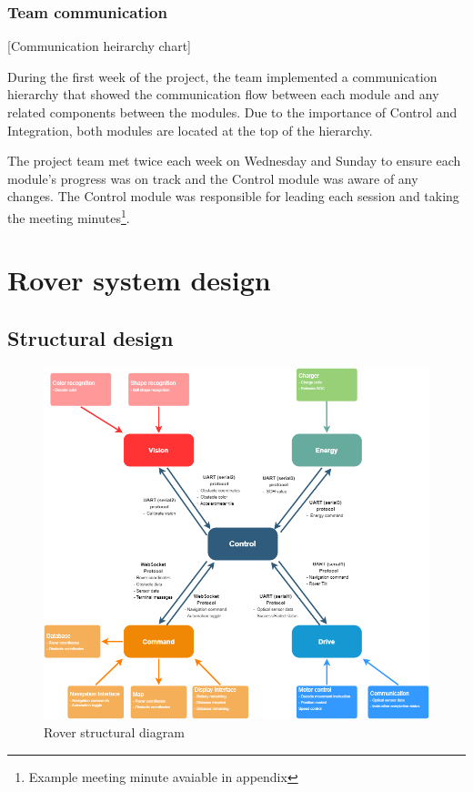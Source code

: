 \documentclass[11pt, a4paper]{article}
\begin{document}
\subsubsection{Team communication}

\begin{center}
    [Communication heirarchy chart]
\end{center}

During the first week of the project, the team implemented a communication hierarchy that showed the communication flow between each module and any related components between the modules. Due to the importance of Control and Integration, both modules are located at the top of the hierarchy.

The project team met twice each week on Wednesday and Sunday to ensure each module's progress was on track and the Control module was aware of any changes. The Control module was responsible for leading each session and taking the meeting minutes\footnote{Example meeting minute avaiable in appendix}. 
 




\vfill






\pagebreak
\section{Rover system design}

\subsection{Structural design}

\begin{figure} [h!]
    \centering
    \includegraphics[scale=0.5]{Structure.png}
    \caption{Rover structural diagram}
\end{figure}
\end{document}
